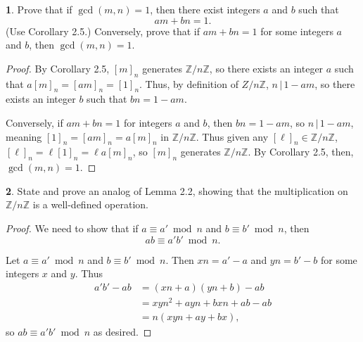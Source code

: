 \documentclass{article}
\theoremstyle{definition}
\newtheorem{ex}{}[section]
\begin{document}
\begin{ex}
	Prove that if $\gcd(m, n) = 1$, then there exist integers $a$ and $b$ such that \begin{equation*}
		am + bn = 1.
	\end{equation*}
	(Use Corollary 2.5.)
	Conversely, prove that if $am + bn = 1$ for some integers $a$ and $b$, then $\gcd(m, n) = 1$.
\end{ex}
\begin{proof}
	By Corollary 2.5, $[m]_n$ generates $\mathbb{Z}/n \mathbb{Z}$, so there exists an integer $a$ such that $a[m]_n = [am]_n = [1]_n$.
	Thus, by definition of $Z/n \mathbb{Z}$, $n\,|\,1 - am$, so there exists an integer $b$ such that $bn = 1 - am$.

	Conversely, if $am + bn = 1$ for integers $a$ and $b$, then $bn = 1 - am$, so $n\,|\,1 - am$, meaning $[1]_n = [am]_n = a[m]_n$ in $\mathbb{Z}/n \mathbb{Z}$.
	Thus given any $[\ell]_n \in \mathbb{Z}/n \mathbb{Z}$, $[\ell]_n = \ell[1]_n = \ell a [m]_n$, so $[m]_n$ generates $\mathbb{Z}/n \mathbb{Z}$.
	By Corollary 2.5, then, $\gcd(m, n) = 1$.
\end{proof}

\begin{ex}
	State and prove an analog of Lemma 2.2, showing that the multiplication on $\mathbb{Z}/n \mathbb{Z}$ is a well-defined operation.
\end{ex}
\begin{proof}
	We need to show that if $a \equiv a'\bmod n$ and $b \equiv b' \bmod n$, then \begin{equation*}
		ab \equiv a'b' \bmod n.
	\end{equation*}

	Let $a \equiv a' \bmod n$ and $b \equiv b' \bmod n$.
	Then $xn = a' - a$ and $yn = b' - b$ for some integers $x$ and $y$.
	Thus \begin{align*}
		a'b' - ab & = (xn + a)(yn + b) - ab       \\
		          & = xyn^2 + ayn + bxn + ab - ab \\
		          & = n(xyn + ay + bx),
	\end{align*}
	so $ab \equiv a'b' \bmod n$ as desired.
\end{proof}
\end{document}
